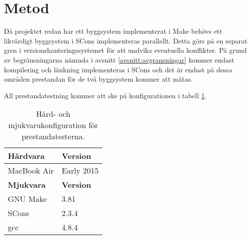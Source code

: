 \section{Metod}
Då projektet redan har ett byggsystem implementerat i Make behövs ett likvärdigt byggsystem i SCons implementeras parallellt. Detta görs på en separat gren i versionshanteringssystemet för att undvika eventuella konflikter. På grund av begränsningarna nämnda i avsnitt \ref{avsnitt:avgransningar} kommer endast kompilering och länkning implementeras i SCons och det är endast på dessa områden prestandan för de två byggsystem kommer att mätas.

All prestandatestning kommer att ske på konfigurationen i tabell \ref{tabell:konfig}.

\begin{table}[h!]
  \centering
  \begin{tabular}{|l|l|}
    \hline
    \textbf{Hårdvara} & \textbf{Version} \\ \hline
    MacBook Air & Early 2015 \\ \hline
    \textbf{Mjukvara} & \textbf{Version} \\ \hline
    GNU Make & 3.81 \\ \hline
    SCons & 2.3.4 \\ \hline
    gcc & 4.8.4 \\ \hline
  \end{tabular}
  \caption{Hård- och mjukvarukonfiguration för prestandatesterna.}
  \label{tabell:konfig}
\end{table}
